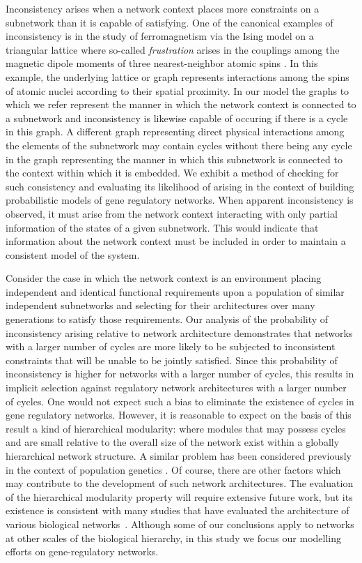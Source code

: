 Inconsistency arises when a network context places more constraints on a subnetwork than it is capable of satisfying.  One of the canonical examples of inconsistency is in the study of ferromagnetism via the Ising model on a triangular lattice where so-called \emph{frustration} arises in the couplings among the magnetic dipole moments of three nearest-neighbor atomic spins \cite{Wannier1950,Toulouse1977,Vannimenus1977}. In this example, the underlying lattice or graph represents interactions among the spins of atomic nuclei according to their spatial proximity. In our model the graphs to which we refer represent the manner in which the network context is connected to a subnetwork and inconsistency is likewise capable of occuring if there is a cycle in this graph. A different graph representing direct physical interactions among the elements of the subnetwork may contain cycles without there being any cycle in the graph representing the manner in which this subnetwork is connected to the context within which it is embedded. We exhibit a method of checking for such consistency and evaluating its likelihood of arising in the context of building probabilistic models of gene regulatory networks. When apparent inconsistency is observed, it must arise from the network context interacting with only partial information of the states of a given subnetwork. This would indicate that information about the network context must be included in order to maintain a consistent model of the system.

Consider the case in which the network context is an environment placing independent and identical functional requirements upon a population of similar independent subnetworks and selecting for their architectures over many generations to satisfy those requirements. Our analysis of the probability of inconsistency arising relative to network architecture demonstrates that networks with a larger number of cycles are more likely to be subjected to inconsistent constraints that will be unable to be jointly satisfied. Since this probability of inconsistency is higher for networks with a larger number of cycles, this results in implicit selection against regulatory network architectures with a larger number of cycles. One would not expect such a bias to eliminate the existence of cycles in gene regulatory networks. However, it is reasonable to expect on the basis of this result a kind of hierarchical modularity: where modules that may possess cycles and are small relative to the overall size of the network exist within a globally hierarchical network structure. A similar problem has been considered previously in the context of population genetics \cite{EthanAkin389}. Of course, there are other factors which may contribute to the development of such network architectures. The evaluation of the hierarchical modularity property will require extensive future work, but its existence is consistent with many studies that have evaluated the architecture of various biological networks~\cite{Ravasz2002,Segre2005,Wagner2007,Erwin2009,Jothi2009,Bhardwaj2010,Chalancon2012,Colm}. Although some of our conclusions apply to networks at other scales of the biological hierarchy, in this study we focus our modelling efforts on gene-regulatory networks.

